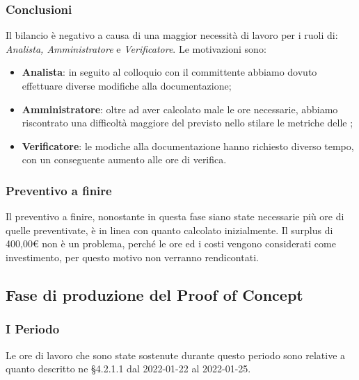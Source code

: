 \subsubsection{Conclusioni}
Il bilancio è negativo a causa di una maggior necessità di lavoro per i ruoli di: \textit{Analista, Amministratore} e \textit{Verificatore}. Le motivazioni sono:
\begin{itemize}
\item \textbf{Analista}: in seguito al colloquio con il committente\glo{} abbiamo dovuto effettuare diverse modifiche alla documentazione;
\item \textbf{Amministratore}: oltre ad aver calcolato male le ore necessarie, abbiamo riscontrato una difficoltà maggiore del previsto nello stilare le metriche delle \NdP{};
\item \textbf{Verificatore}: le modiche alla documentazione hanno richiesto diverso tempo, con un conseguente aumento alle ore di verifica.
\end{itemize}

\subsubsection{Preventivo a finire}
Il preventivo a finire, nonostante in questa fase siano state necessarie più ore di quelle preventivate, è in linea con quanto calcolato inizialmente. Il surplus di 400,00\euro \xspace non è un problema, perché le ore ed i costi vengono considerati come investimento, per questo motivo non verranno rendicontati.

\pagebreak


\subsection{Fase di produzione del Proof of Concept}

\subsubsection{I Periodo}
Le ore di lavoro che sono state sostenute durante questo periodo sono relative a quanto descritto ne §4.2.1.1 dal 2022-01-22 al 2022-01-25.

